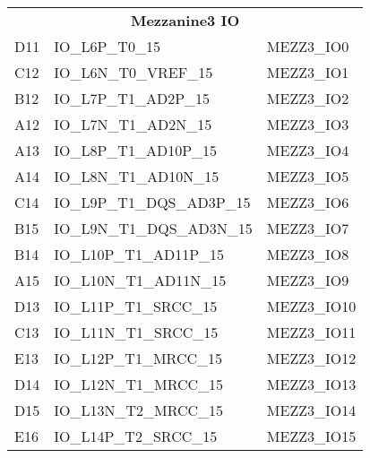 \begin{footnotesize}
	\begin{longtable}{|l|p{6cm}|p{6cm}|}
		\hline
		\multicolumn{3}{|c|}{\multirow{2}{*}{\textbf{\large{Mezzanine3 IO}}}}\\
		\multicolumn{3}{|c|}{} \\ \hline 
D11	&	IO\_L6P\_T0\_15	&	MEZZ3\_IO0	\\ \hline
C12	&	IO\_L6N\_T0\_VREF\_15	&	MEZZ3\_IO1	\\ \hline
B12	&	IO\_L7P\_T1\_AD2P\_15	&	MEZZ3\_IO2	\\ \hline
A12	&	IO\_L7N\_T1\_AD2N\_15	&	MEZZ3\_IO3	\\ \hline
A13	&	IO\_L8P\_T1\_AD10P\_15	&	MEZZ3\_IO4	\\ \hline
A14	&	IO\_L8N\_T1\_AD10N\_15	&	MEZZ3\_IO5	\\ \hline
C14	&	IO\_L9P\_T1\_DQS\_AD3P\_15	&	MEZZ3\_IO6	\\ \hline
B15	&	IO\_L9N\_T1\_DQS\_AD3N\_15	&	MEZZ3\_IO7	\\ \hline
B14	&	IO\_L10P\_T1\_AD11P\_15	&	MEZZ3\_IO8	\\ \hline
A15	&	IO\_L10N\_T1\_AD11N\_15	&	MEZZ3\_IO9	\\ \hline
D13	&	IO\_L11P\_T1\_SRCC\_15	&	MEZZ3\_IO10	\\ \hline
C13	&	IO\_L11N\_T1\_SRCC\_15	&	MEZZ3\_IO11	\\ \hline
E13	&	IO\_L12P\_T1\_MRCC\_15	&	MEZZ3\_IO12	\\ \hline
D14	&	IO\_L12N\_T1\_MRCC\_15	&	MEZZ3\_IO13	\\ \hline
D15	&	IO\_L13N\_T2\_MRCC\_15	&	MEZZ3\_IO14	\\ \hline
E16	&	IO\_L14P\_T2\_SRCC\_15	&	MEZZ3\_IO15	\\ \hline

	\end{longtable}
\end{footnotesize}


